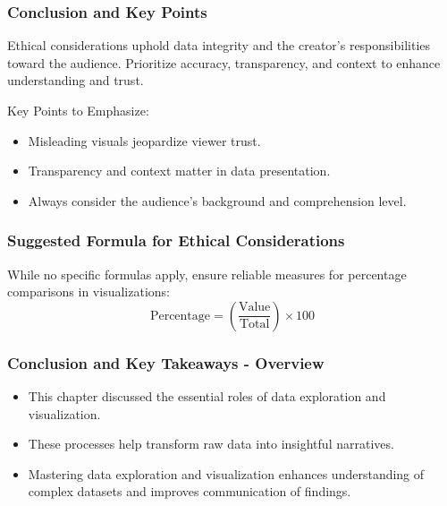 \documentclass[aspectratio=169]{beamer}
\begin{document}
\begin{frame}[fragile]
    \frametitle{Conclusion and Key Points}
    Ethical considerations uphold data integrity and the creator's responsibilities toward the audience. Prioritize accuracy, transparency, and context to enhance understanding and trust.

    \begin{block}{Key Points to Emphasize:}
        \begin{itemize}
            \item Misleading visuals jeopardize viewer trust.
            \item Transparency and context matter in data presentation.
            \item Always consider the audience's background and comprehension level.
        \end{itemize}
    \end{block}
\end{frame}

\begin{frame}[fragile]
    \frametitle{Suggested Formula for Ethical Considerations}
    While no specific formulas apply, ensure reliable measures for percentage comparisons in visualizations:
    \begin{equation}
        \text{Percentage} = \left( \frac{\text{Value}}{\text{Total}} \right) \times 100
    \end{equation}
\end{frame}

\begin{frame}[fragile]
    \frametitle{Conclusion and Key Takeaways - Overview}
    \begin{itemize}
        \item This chapter discussed the essential roles of data exploration and visualization.
        \item These processes help transform raw data into insightful narratives.
        \item Mastering data exploration and visualization enhances understanding of complex datasets and improves communication of findings.
    \end{itemize}
\end{frame}
\end{document}
